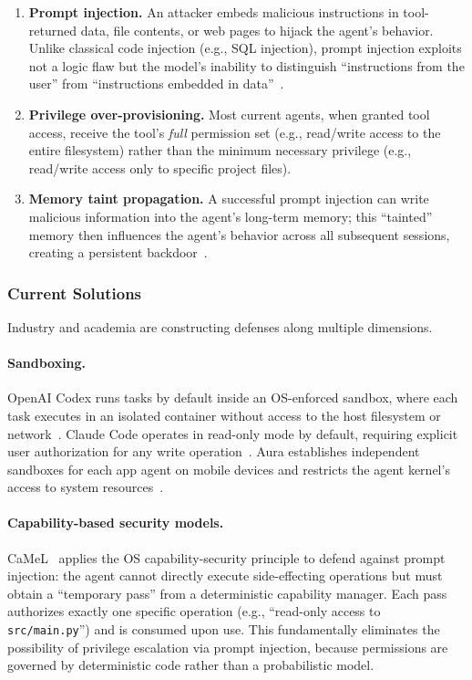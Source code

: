 \documentclass[11pt,a4paper]{article}
\begin{document}
\begin{enumerate}[nosep]
\item \textbf{Prompt injection.}
An attacker embeds malicious instructions in tool-returned data, file contents, or web pages to hijack the agent's behavior.
Unlike classical code injection (e.g., SQL injection), prompt injection exploits not a logic flaw but the model's inability to distinguish ``instructions from the user'' from ``instructions embedded in data''~\cite{debenedetti2025camel,owasp_agentic2026}.

\item \textbf{Privilege over-provisioning.}
Most current agents, when granted tool access, receive the tool's \emph{full} permission set (e.g., read/write access to the entire filesystem) rather than the minimum necessary privilege (e.g., read/write access only to specific project files).

\item \textbf{Memory taint propagation.}
A successful prompt injection can write malicious information into the agent's long-term memory; this ``tainted'' memory then influences the agent's behavior across all subsequent sessions, creating a persistent backdoor~\cite{aura2025}.
\end{enumerate}

\subsubsection{Current Solutions}
Industry and academia are constructing defenses along multiple dimensions.

\paragraph{Sandboxing.}
OpenAI Codex runs tasks by default inside an OS-enforced sandbox, where each task executes in an isolated container without access to the host filesystem or network~\cite{openai_codex_sandbox_2026}.
Claude Code operates in read-only mode by default, requiring explicit user authorization for any write operation~\cite{anthropic_claudecode_security_2026}.
Aura establishes independent sandboxes for each app agent on mobile devices and restricts the agent kernel's access to system resources~\cite{aura2025}.

\paragraph{Capability-based security models.}
CaMeL~\cite{debenedetti2025camel} applies the OS capability-security principle to defend against prompt injection: the agent cannot directly execute side-effecting operations but must obtain a ``temporary pass'' from a deterministic capability manager.
Each pass authorizes exactly one specific operation (e.g., ``read-only access to \texttt{src/main.py}'') and is consumed upon use.
This fundamentally eliminates the possibility of privilege escalation via prompt injection, because permissions are governed by deterministic code rather than a probabilistic model.
\end{document}
